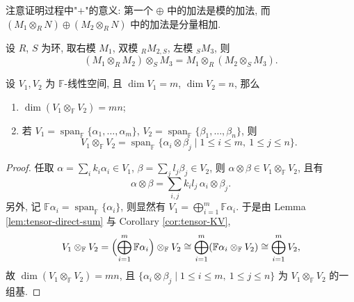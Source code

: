 \begin{remark}\label{rem:tensor-plus}
注意证明过程中"$+$"的意义: 第一个 $\oplus$ 中的加法是模的加法, 而
$(M_1\otimes_R N)\oplus(M_2\otimes_R N)$ 中的加法是分量相加.
\end{remark}

\begin{lemma}[结合律]\label{lem:tensor-assoc}
设 $R$, $S$ 为环, 取右模 $M_1$, 双模 ${}_R M_{2,S}$, 左模 ${}_S M_3$, 则
\[
  (M_1\otimes_R M_2)\otimes_S M_3=M_1\otimes_R(M_2\otimes_S M_3).
\]
\end{lemma}

\begin{proposition}\label{prop:tensor-dim}
设 $V_1,V_2$ 为 $\mathbb{F}$-线性空间, 且 $\dim V_1=m$, $\dim V_2=n$, 那么
\begin{enumerate}[label=(\arabic*)]
  \item $\dim(V_1\otimes_{\mathbb{F}} V_2)=mn$;
  \item 若 $V_1=\operatorname{span}_{\mathbb{F}}\{\alpha_1,\dots,\alpha_m\}$,
        $V_2=\operatorname{span}_{\mathbb{F}}\{\beta_1,\dots,\beta_n\}$, 则
        \[
          V_1\otimes_{\mathbb{F}} V_2=\operatorname{span}_{\mathbb{F}}\{\alpha_i\otimes\beta_j\mid 1\le i\le m,\ 1\le j\le n\}.
        \]
\end{enumerate}
\end{proposition}

\begin{proof}
任取 $\alpha=\sum_i k_i\alpha_i\in V_1$, $\beta=\sum_j l_j\beta_j\in V_2$, 则
$\alpha\otimes\beta\in V_1\otimes_{\mathbb{F}} V_2$, 且有
\[
  \alpha\otimes\beta=\sum_{i,j} k_il_j\,\alpha_i\otimes\beta_j .
\]
另外, 记 $\mathbb{F}\alpha_i=\operatorname{span}_{\mathbb{F}}\{\alpha_i\}$, 则显然有 $V_1=\bigoplus_{i=1}^{m}\mathbb{F}\alpha_i$.
于是由 Lemma \ref{lem:tensor-direct-sum} 与 Corollary \ref{cor:tensor-KV},
\[
  V_1\otimes_{\mathbb{F}} V_2=\Bigl(\bigoplus_{i=1}^{m}\mathbb{F}\alpha_i\Bigr)\otimes_{\mathbb{F}} V_2
  \cong\bigoplus_{i=1}^{m}(\mathbb{F}\alpha_i\otimes_{\mathbb{F}} V_2)\cong\bigoplus_{i=1}^{m}V_2,
\]
故 $\dim(V_1\otimes_{\mathbb{F}} V_2)=mn$, 且 $\{\alpha_i\otimes\beta_j\mid 1\le i\le m,\ 1\le j\le n\}$
为 $V_1\otimes_{\mathbb{F}} V_2$ 的一组基.
\end{proof}

